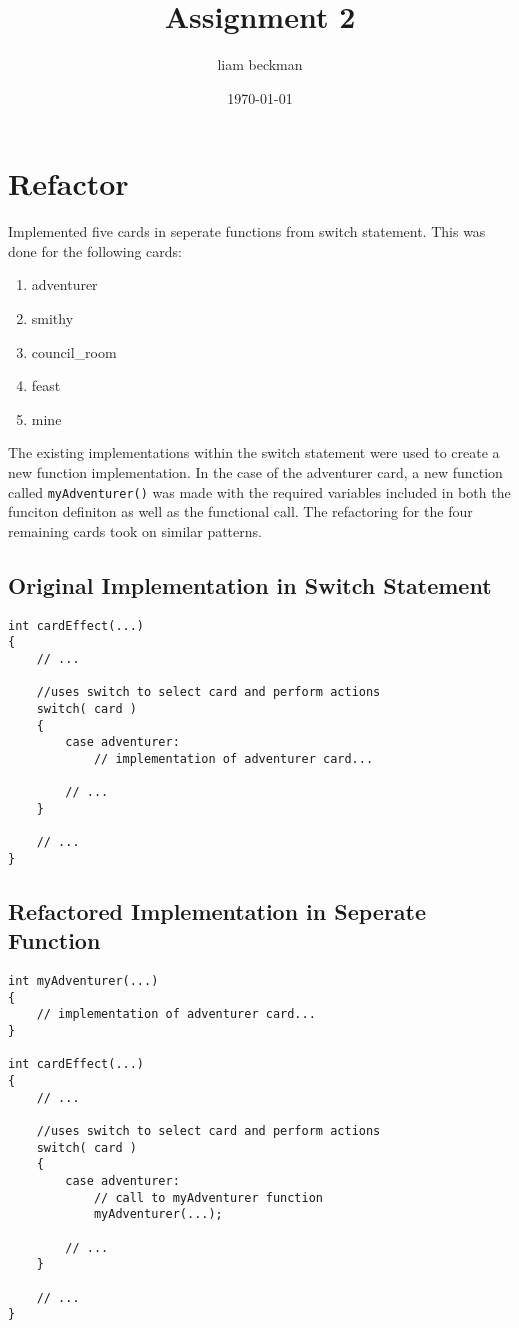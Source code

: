 \documentclass[11pt]{article}
\author{liam beckman}
\date{\today}
\title{Assignment 2}
\begin{document}
\maketitle

\section{Refactor}
\label{sec:org945b52d}

Implemented five cards in seperate functions from switch statement. This was done for the following cards:

\begin{enumerate}
\item adventurer
\item smithy
\item council\_room
\item feast
\item mine
\end{enumerate}

The existing implementations within the switch statement were used to create a new function implementation. In the case of the adventurer card, a new function called \texttt{myAdventurer()} was made with the required variables included in both the funciton definiton as well as the functional call. The refactoring for the four remaining cards took on similar patterns.

\subsection{Original Implementation in Switch Statement}
\label{sec:org1809fad}
\begin{verbatim}
int cardEffect(...)
{
    // ...

    //uses switch to select card and perform actions
    switch( card )
    {
        case adventurer:
            // implementation of adventurer card...

        // ...
    }

    // ...
}
\end{verbatim}

\subsection{Refactored Implementation in Seperate Function}
\label{sec:orgd7ab4d8}

\begin{verbatim}
int myAdventurer(...)
{
    // implementation of adventurer card...
}

int cardEffect(...)
{
    // ...

    //uses switch to select card and perform actions
    switch( card )
    {
        case adventurer:
            // call to myAdventurer function
            myAdventurer(...);

        // ...
    }

    // ...
}
\end{verbatim}
\end{document}
